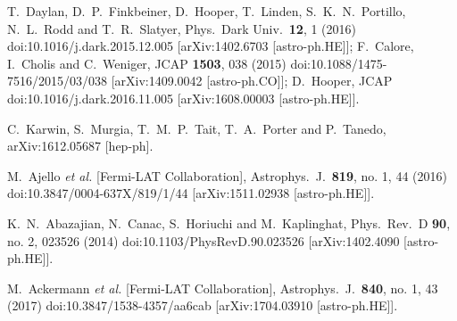 \documentclass[11pt]{article}
\begin{document}
\begin{thebibliography}{99}
  T.~Daylan, D.~P.~Finkbeiner, D.~Hooper, T.~Linden, S.~K.~N.~Portillo, N.~L.~Rodd and T.~R.~Slatyer,
  Phys.\ Dark Univ.\  {\bf 12}, 1 (2016)
  doi:10.1016/j.dark.2015.12.005
  [arXiv:1402.6703 [astro-ph.HE]];
  F.~Calore, I.~Cholis and C.~Weniger,
  JCAP {\bf 1503}, 038 (2015)
  doi:10.1088/1475-7516/2015/03/038
  [arXiv:1409.0042 [astro-ph.CO]];
  D.~Hooper,
  JCAP
  doi:10.1016/j.dark.2016.11.005
  [arXiv:1608.00003 [astro-ph.HE]].
  
    
  C.~Karwin, S.~Murgia, T.~M.~P.~Tait, T.~A.~Porter and P.~Tanedo,
  arXiv:1612.05687 [hep-ph].


  M.~Ajello {\it et al.} [Fermi-LAT Collaboration],
  Astrophys.\ J.\  {\bf 819}, no. 1, 44 (2016)
  doi:10.3847/0004-637X/819/1/44
  [arXiv:1511.02938 [astro-ph.HE]].

  K.~N.~Abazajian, N.~Canac, S.~Horiuchi and M.~Kaplinghat,
  Phys.\ Rev.\ D {\bf 90}, no. 2, 023526 (2014)
  doi:10.1103/PhysRevD.90.023526
  [arXiv:1402.4090 [astro-ph.HE]].
  
  M.~Ackermann {\it et al.} [Fermi-LAT Collaboration],
  Astrophys.\ J.\  {\bf 840}, no. 1, 43 (2017)
  doi:10.3847/1538-4357/aa6cab
  [arXiv:1704.03910 [astro-ph.HE]].


\end{thebibliography}
\end{document}
